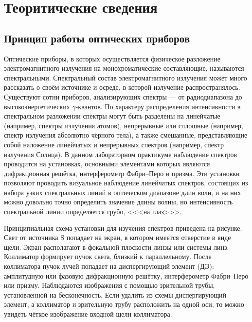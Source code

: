 \section{Теоритические сведения}
\subsection{Принцип работы оптических приборов}
Оптические приборы, в которых осуществляется физическое разложение электромагнитного излучения на монохроматические составляющие, называются спектральными. Спектральный состав электромагнитного излучения может много рассказать о своём источнике и осреде, в которой излучение распространялось. Существуют сотни приборов, анализирующих спектры ---  от радиодиапазона до высокоэнергетических $\gamma$-квантов. По характеру распределения интенсивности в спектральном разложении спектры могут быть разделены на линейчатые (например, спектры излучения атомов), непрерывные или сплошные (например, спектр излучения абсолютно чёрного тела), а также смешанные, представляющие собой наложение линейчатых и непрерывных спектров (например, спектр излучения Солнца). В данном лабораторном практикуме наблюдение спектров проводится на установках, основными элементами которых являются дифракционная решётка, интерферометр Фабри–Перо и призма.  Эти установки позволяют проводить визуальное наблюдение линейчатых спектров, состоящих из набора узких спектральных линий в оптическом диапазоне длин волн, и на них можно довольно точно определить значение длины волны, но интенсивность спектральной линии определяется грубо, <<<на глаз>>>.

\begin{figure}[ht!]
\end{figure}

Принципиальная схема установки для изучения спектров приведена на рисунке. Свет от источника S попадает на экран, в котором имеется отверстие в виде щели. Экран располагают в фокальной плоскости линзы или системы линз. Коллиматор формирует пучок света, близкий к параллельному. После коллиматора пучок лучей попадает на диспергирующий элемент (ДЭ): амплитудную или фазовую дифракционную решётку, интерферометр Фабри–Перо или призму. Наблюдаются изображения с помощью зрительной трубы, установленной на бесконечность. Если удалить из схемы диспергирующий элемент, а коллиматор и зрительную трубу расположить на одной оси, то можно увидеть чёткое изображение входной щели коллиматора.

